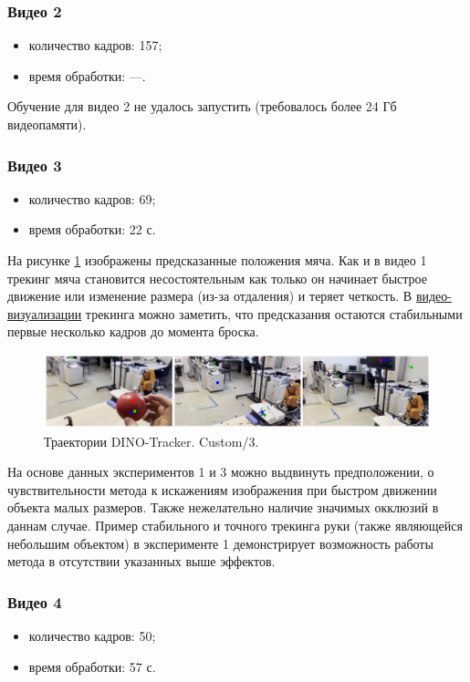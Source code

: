 \documentclass[a4paper, 14pt]{extarticle}
\theoremstyle{definition}
\theoremstyle{plain}
\theoremstyle{remark}
\begin{document}
\subsubsection{Видео 2}
\begin{itemize}
	\item количество кадров: 157;
	\item время обработки: ---.
\end{itemize}
Обучение для видео 2 не удалось запустить (требовалось более 24 Гб видеопамяти).

\subsubsection{Видео 3}
\begin{itemize}
	\item количество кадров: 69;
	\item время обработки: 22 с.
\end{itemize}

На рисунке \ref{fig:custom-3} изображены предсказанные положения мяча. Как и в видео 1 трекинг мяча становится несостоятельным как только он начинает быстрое движение или изменение размера (из-за отдаления) и теряет четкость. В \href{https://drive.google.com/file/d/1u9dOc59ZkDruSFHMgPoj0jT528nW_ne4/view?usp=drive_link}{видео-визуализации} трекинга можно заметить, что предсказания остаются стабильными первые несколько кадров до момента броска.
\begin{figure}
    [H]
    \centering
    \includegraphics[width=\textwidth]{figs/custom-3.png}
    \caption{Траектории DINO-Tracker. Custom/3.}
    \label{fig:custom-3}
\end{figure}

На основе данных экспериментов 1 и 3 можно выдвинуть предположении, о чувствительности метода к искажениям изображения при быстром движении объекта малых размеров. Также нежелательно наличие значимых окклюзий в даннам случае. Пример стабильного и точного трекинга руки (также являющейся небольшим объектом) в эксперименте 1 демонстрирует возможность работы метода в отсутствии указанных выше эффектов.

\subsubsection{Видео 4}
\begin{itemize}
	\item количество кадров: 50;
	\item время обработки: 57 с.
\end{itemize}
\end{document}
